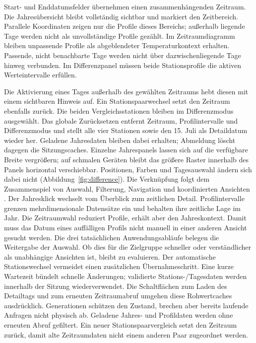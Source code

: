 \documentclass[usegeometry=true]{scrartcl}
\begin{document}
Start- und Enddatumsfelder übernehmen einen zusammenhängenden Zeitraum.
Die Jahresübersicht bleibt vollständig sichtbar und markiert den
Zeitbereich. Parallele Koordinaten zeigen nur die Profile dieses Bereichs;
außerhalb liegende Tage werden nicht als unvollständige Profile gezählt.
Im Zeitraumdiagramm bleiben unpassende Profile als abgeblendeter
Temperaturkontext erhalten. Passende, nicht benachbarte Tage werden
nicht über dazwischenliegende Tage hinweg verbunden. Im Differenzpanel
müssen beide Stationsprofile die aktiven Werteintervalle erfüllen.

Die Aktivierung eines Tages außerhalb des gewählten Zeitraums hebt diesen
mit einem sichtbaren Hinweis auf. Ein Stationspaarwechsel setzt den
Zeitraum ebenfalls zurück. Die beiden Vergleichsstationen bleiben im
Differenzmodus ausgewählt. Das globale Zurücksetzen entfernt Zeitraum,
Profilintervalle und Differenzmodus und stellt alle vier Stationen sowie
den 15. Juli als Detaildatum wieder her. Geladene Jahresdaten bleiben dabei
erhalten; Abmeldung löscht dagegen die Sitzungscaches.
Einzelne Jahrespanels lassen sich auf die verfügbare Breite vergrößern;
auf schmalen Geräten bleibt das größere Raster innerhalb des Panels
horizontal verschiebbar. Positionen, Farben und Tagesauswahl ändern sich
dabei nicht (Abbildung~\ref{fig:difference}).
Die Verknüpfung folgt dem Zusammenspiel von Auswahl, Filterung, Navigation
und koordinierten Ansichten \autocite{heer2012interactive}. Der Jahresklick
wechselt vom Überblick zum zeitlichen Detail. Profilintervalle grenzen
mehrdimensionale Datensätze ein und behalten ihre zeitliche Lage im Jahr.
Die Zeitraumwahl reduziert Profile, erhält aber den Jahreskontext.
Damit muss das Datum eines auffälligen Profils nicht manuell in einer
anderen Ansicht gesucht werden. Die drei tatsächlichen Anwendungsabläufe
belegen die Weitergabe der Auswahl. Ob dies für die Zielgruppe schneller
oder verständlicher als unabhängige Ansichten ist, bleibt zu evaluieren.
Der automatische Stationswechsel vermeidet einen zusätzlichen
Übernahmeschritt. Eine kurze Wartezeit bündelt schnelle Änderungen;
validierte Stations-/Tagesdaten werden innerhalb der Sitzung wiederverwendet.
Die Schaltflächen zum Laden des Detailtags und zum erneuten Zeitraumabruf
umgehen diese Rohwertcaches ausdrücklich. Generationen schützen den Zustand,
brechen aber bereits laufende Anfragen nicht physisch ab. Geladene Jahres- und Profildaten werden
ohne erneuten Abruf gefiltert. Ein neuer Stationspaarvergleich setzt
den Zeitraum zurück, damit alte Zeitraumdaten nicht einem anderen Paar
zugeordnet werden.
\end{document}
